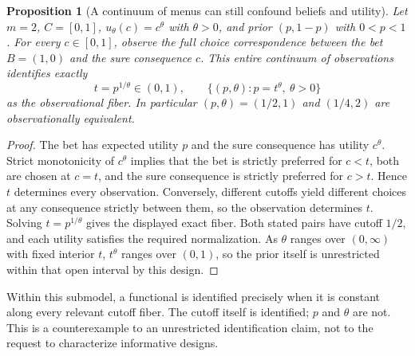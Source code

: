 \documentclass[11pt,a4paper]{article}
\newtheorem{proposition}[theorem]{Proposition}
\theoremstyle{definition}\newtheorem{definition}[theorem]{Definition}
\theoremstyle{remark}\newtheorem{remark}[theorem]{Remark}
\newcommand{\1}{\mathbf 1}
\begin{document}
\begin{proposition}[A continuum of menus can still confound beliefs and utility]\label{prop:cutoff}
Let $m=2$, $C=[0,1]$, $u_\theta(c)=c^\theta$ with $\theta>0$, and prior $(p,1-p)$ with $0<p<1$. For every $c\in[0,1]$, observe the full choice correspondence between the bet $B=(1,0)$ and the sure consequence $c$. This entire continuum of observations identifies exactly
\[
 t=p^{1/\theta}\in(0,1),
 \qquad\{(p,\theta):p=t^\theta,\ \theta>0\}
\]
as the observational fiber. In particular $(p,\theta)=(1/2,1)$ and $(1/4,2)$ are observationally equivalent.
\end{proposition}
\begin{proof}
The bet has expected utility $p$ and the sure consequence has utility $c^\theta$. Strict monotonicity of $c^\theta$ implies that the bet is strictly preferred for $c<t$, both are chosen at $c=t$, and the sure consequence is strictly preferred for $c>t$. Hence $t$ determines every observation. Conversely, different cutoffs yield different choices at any consequence strictly between them, so the observation determines $t$. Solving $t=p^{1/\theta}$ gives the displayed exact fiber. Both stated pairs have cutoff $1/2$, and each utility satisfies the required normalization. As $\theta$ ranges over $(0,\infty)$ with fixed interior $t$, $t^\theta$ ranges over $(0,1)$, so the prior itself is unrestricted within that open interval by this design.
\end{proof}
Within this submodel, a functional is identified precisely when it is constant along every relevant cutoff fiber. The cutoff itself is identified; $p$ and $\theta$ are not. This is a counterexample to an unrestricted identification claim, not to the request to characterize informative designs.
\end{document}
